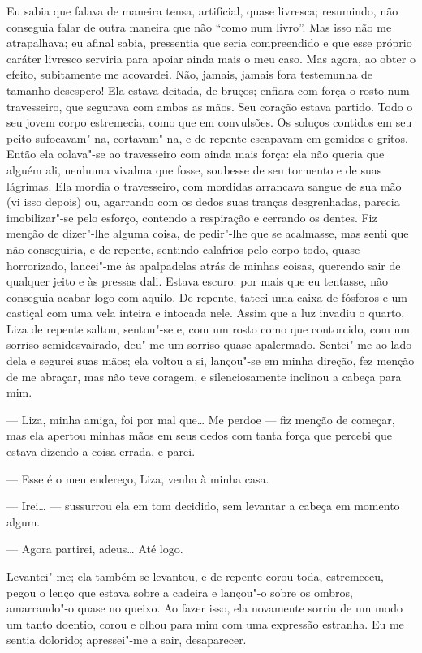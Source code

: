 Eu sabia que falava de maneira tensa, artificial, quase livresca;
resumindo, não conseguia falar de outra maneira que não “como num
livro”. Mas isso não me atrapalhava; eu afinal sabia, pressentia que
seria compreendido e que esse próprio caráter livresco serviria para
apoiar ainda mais o meu caso. Mas agora, ao obter o efeito, subitamente
me acovardei. Não, jamais, jamais fora testemunha de tamanho desespero!
Ela estava deitada, de bruços; enfiara com força o rosto num
travesseiro, que segurava com ambas as mãos. Seu coração estava
partido. Todo o seu jovem corpo estremecia, como que em convulsões. Os
soluços contidos em seu peito sufocavam"-na, cortavam"-na, e de repente
escapavam em gemidos e gritos. Então ela colava"-se ao travesseiro com
ainda mais força: ela não queria que alguém ali, nenhuma vivalma que
fosse, soubesse de seu tormento e de suas lágrimas. Ela mordia o
travesseiro, com mordidas arrancava sangue de sua mão (vi isso depois)
ou, agarrando com os dedos suas tranças desgrenhadas, parecia
imobilizar"-se pelo esforço, contendo a respiração e cerrando os dentes.
Fiz menção de dizer"-lhe alguma coisa, de pedir"-lhe que se acalmasse,
mas senti que não conseguiria, e de repente, sentindo calafrios pelo
corpo todo, quase horrorizado, lancei"-me às apalpadelas atrás de minhas
coisas, querendo sair de qualquer jeito e às pressas dali. Estava
escuro: por mais que eu tentasse, não conseguia acabar logo com aquilo.
De repente, tateei uma caixa de fósforos e um castiçal com uma vela
inteira e intocada nele. Assim que a luz invadiu o quarto, Liza de
repente saltou, sentou"-se e, com um rosto como que contorcido, com um
sorriso semidesvairado, deu"-me um sorriso quase apalermado. Sentei"-me
ao lado dela e segurei suas mãos; ela voltou a si, lançou"-se em minha
direção, fez menção de me abraçar, mas não teve coragem, e
silenciosamente inclinou a cabeça para mim.

--- Liza, minha amiga, foi por mal que\ldots{} Me perdoe --- fiz menção de
começar, mas ela apertou minhas mãos em seus dedos com tanta força que
percebi que estava dizendo a coisa errada, e parei.

--- Esse é o meu endereço, Liza, venha à minha casa.

--- Irei\ldots{} --- sussurrou ela em tom decidido, sem levantar a cabeça em
momento algum.

--- Agora partirei, adeus\ldots{} Até logo.

Levantei"-me; ela também se levantou, e de repente corou toda,
estremeceu, pegou o lenço que estava sobre a cadeira e lançou"-o sobre
os ombros, amarrando"-o quase no queixo. Ao fazer isso, ela novamente
sorriu de um modo um tanto doentio, corou e olhou para mim com uma
expressão estranha. Eu me sentia dolorido; apressei"-me a sair,
desaparecer.

